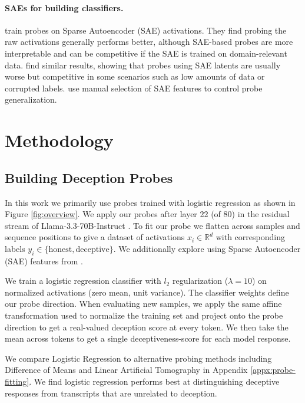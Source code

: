 \documentclass{article}
\begin{document}
\paragraph{SAEs for building classifiers.} \citet{Bricken2024_saeclassifiers} train probes on Sparse Autoencoder (SAE) activations.
They find probing the raw activations generally performs better, although SAE-based probes are more interpretable and can be competitive if the SAE is trained on domain-relevant data.
\citet{Kantamneni2024_saeprobing} find similar results, showing that probes using SAE latents are usually worse but competitive in some scenarios such as low amounts of data or corrupted labels.
\citet{Marks2024_sparse} use manual selection of SAE features to control probe generalization.

\section{Methodology}\label{methodology}
\subsection{Building Deception Probes}\label{building-deception-probes}

In this work we primarily use probes trained with logistic regression as shown in Figure \ref{fig:overview}.
We apply our probes after layer 22 (of 80) in the residual stream of
Llama-3.3-70B-Instruct \citep{grattafiori2024_llama3}. To fit our probe we flatten across samples and
sequence positions to give a dataset of activations $x_i \in \mathbb{R}^d$ with
corresponding labels $y_i \in \{\text{honest}, \text{deceptive}\}$. We additionally explore
using Sparse Autoencoder (SAE) features from \citet{McGrath2024_saes}.

We train a logistic regression classifier with $l_2$ regularization ($\lambda=10$)
on normalized activations (zero mean, unit variance). The classifier
weights define our probe direction. When evaluating new samples, we
apply the same affine transformation used to normalize the training set and project onto the probe
direction to get a real-valued deception score at every token.
We then take the mean across tokens to get a single deceptiveness-score for each
model response.

We compare Logistic Regression to alternative probing methods including Difference of Means \citep{Marks2023_geometry} and Linear Artificial Tomography \citep{Zou2023_repe} in Appendix \ref{appx:probe-fitting}. We find logistic regression performs best at distinguishing deceptive responses from transcripts that are unrelated to deception.
\end{document}
